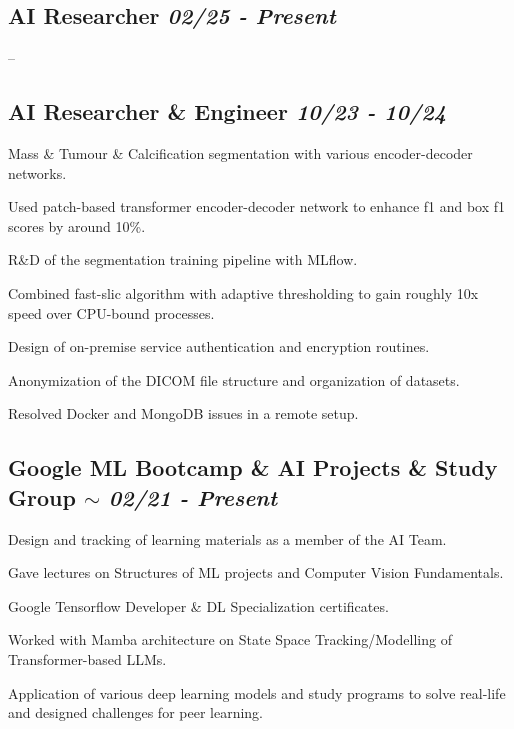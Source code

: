 \documentclass[letter, 14pt]{article}
\begin{document}
\subsection{AI Researcher \hfill \textit{\textmd{02/25 - Present}}}
\begin{zitemize}
\item --
\end{zitemize}


\subsection{AI Researcher \& Engineer \hfill \textit{\textmd{10/23 - 10/24}}}
\begin{zitemize}
\item Mass \& Tumour \& Calcification segmentation with various encoder-decoder networks.
\item Used patch-based transformer encoder-decoder network to enhance f1 and box f1 scores by around 10\%.
\item R\&D of the segmentation training pipeline with MLflow.
\item Combined fast-slic algorithm with adaptive thresholding to gain roughly 10x speed over CPU-bound processes.
\item Design of on-premise service authentication and encryption routines.
\item Anonymization of the DICOM file structure and organization of datasets.
\item Resolved Docker and MongoDB issues in a remote setup. 
\end{zitemize}


\subsection{Google ML Bootcamp \& AI Projects \& Study Group \hfill\textit{\textmd{{\tiny$\sim$} 02/21 - Present}}}
\begin{zitemize}
\item Design and tracking of learning materials as a member of the AI Team.
\item Gave lectures on Structures of ML projects and Computer Vision Fundamentals.
\item Google Tensorflow Developer \& DL Specialization certificates.
\item Worked with Mamba architecture on State Space Tracking/Modelling of Transformer-based LLMs.
\item Application of various deep learning models and study programs to solve real-life and designed challenges for peer learning.
\end{zitemize}
\end{document}
